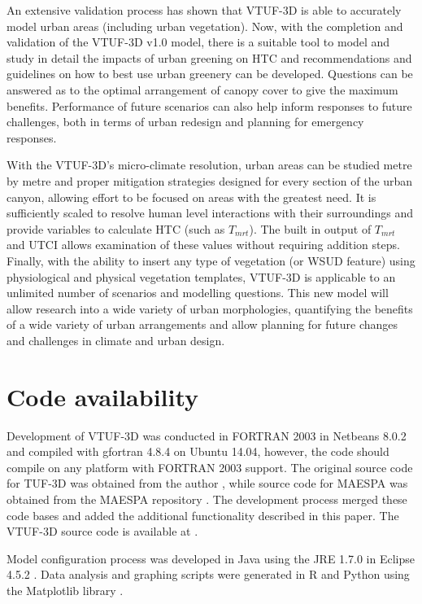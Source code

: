 \documentclass[final,3p,times,authoryear]{elsarticle}
\begin{document}
An extensive validation process has shown that VTUF-3D is able to accurately model urban areas (including urban vegetation). Now, with the completion and validation of the VTUF-3D v1.0 model, there is a suitable tool to model and study in detail the impacts of urban greening on HTC and recommendations and guidelines on how to best use urban greenery can be developed. Questions can be answered as to the optimal arrangement of canopy cover to give the maximum benefits. Performance of future scenarios can also help inform responses to future challenges, both in terms of urban redesign and planning for emergency responses.

With the VTUF-3D's micro-climate resolution, urban areas can be studied metre by metre and proper mitigation strategies designed for every section of the urban canyon, allowing effort to be focused on areas with the greatest need.  It is sufficiently scaled to resolve human level interactions with their surroundings and provide variables to calculate HTC (such as $T_{mrt}$). The built in output of $T_{mrt}$ and UTCI allows examination of these values without requiring addition steps. Finally, with the ability to insert any type of vegetation (or WSUD feature) using physiological and physical vegetation templates, VTUF-3D is applicable to an unlimited number of scenarios and modelling questions. This new model will allow research into a wide variety of urban morphologies, quantifying the benefits of a wide variety of urban arrangements and allow planning for future changes and challenges in climate and urban design.



\section{Code availability}\label{sec:available}

Development of VTUF-3D was conducted in FORTRAN 2003 \citep{GNU2016a} in Netbeans 8.0.2 \citep{Netbeans2016} and compiled with gfortran 4.8.4 \citep{GNU2016} on Ubuntu 14.04, however, the code should compile on any platform with FORTRAN 2003 support. The original source code for TUF-3D was obtained from the author \citep{Krayenhoff2007}, while source code for MAESPA was obtained from the MAESPA repository \citep{Duursma2016}. The development process merged these code bases and added the additional functionality described in this paper. The VTUF-3D source code is available at \cite{Nice2016c}.

Model configuration process was developed in Java using the JRE 1.7.0 \citep{Oracle2016} in Eclipse 4.5.2 \citep{Eclipse2016}. Data analysis and graphing scripts were generated in R \citep{R2013} and Python \citep{Python2016} using the Matplotlib library \citep{Hunter2007}. 
\end{document}
